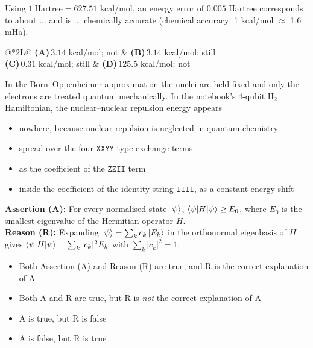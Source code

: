 \documentclass[11pt,a4paper]{article}
\newcommand{\optlabel}[1]{\textbf{(#1)}}
\newenvironment{qitem}[1]{\begin{list}{}{\setlength{\leftmargin}{3.3em}\setlength{\labelwidth}{3.1em}%
  \setlength{\labelsep}{0.2em}\setlength{\topsep}{3pt}\setlength{\parsep}{3pt}}\item[\textbf{Q.#1}\hfill]}{\end{list}}
\newcommand{\qsep}{\par\vspace{2pt}{\color{black!15}\hrule}\vspace{4pt}}
\begin{document}
\begin{qitem}{5}
Using $1\ \text{Hartree} = 627.51$ kcal/mol, an energy error of $0.005$ Hartree corresponds to about ... and is ... chemically
accurate (chemical accuracy: 1 kcal/mol $\approx$ 1.6 mHa).
\par\smallskip\noindent\begin{tabularx}{\linewidth}{@{}*{2}{L}@{}}
\optlabel{A}\,$3.14$ kcal/mol; not & \optlabel{B}\,$3.14$ kcal/mol; still \\[3pt]
\optlabel{C}\,$0.31$ kcal/mol; still & \optlabel{D}\,$125.5$ kcal/mol; not
\end{tabularx}
\end{qitem}
\qsep

\begin{qitem}{6}
In the Born--Oppenheimer approximation the nuclei are held fixed and only the electrons are treated quantum mechanically. In the
notebook's 4-qubit H$_2$ Hamiltonian, the nuclear--nuclear repulsion energy appears
\begin{itemize}[leftmargin=2.6em, labelsep=0.4em, itemsep=2pt, topsep=3pt]
\item[\optlabel{A}] nowhere, because nuclear repulsion is neglected in quantum chemistry
\item[\optlabel{B}] spread over the four $\texttt{XXYY}$-type exchange terms
\item[\optlabel{C}] as the coefficient of the $\texttt{ZZII}$ term
\item[\optlabel{D}] inside the coefficient of the identity string $\texttt{IIII}$, as a constant energy shift
\end{itemize}
\end{qitem}
\qsep

\begin{qitem}{7}
\textbf{Assertion (A):} For every normalised state $\ket\psi$, $\braket{\psi|H|\psi} \ge E_0$, where $E_0$ is the smallest eigenvalue of the
Hermitian operator $H$.\\[1mm]
\textbf{Reason (R):} Expanding $\ket\psi = \sum_k c_k\ket{E_k}$ in the orthonormal eigenbasis of $H$ gives $\braket{\psi|H|\psi} = \sum_k |c_k|^2E_k$ with
$\sum_k|c_k|^2 = 1$.
\begin{itemize}[leftmargin=2.6em, labelsep=0.4em, itemsep=2pt, topsep=3pt]
\item[\optlabel{A}] Both Assertion (A) and Reason (R) are true, and R is the correct explanation of A
\item[\optlabel{B}] Both A and R are true, but R is \emph{not} the correct explanation of A
\item[\optlabel{C}] A is true, but R is false
\item[\optlabel{D}] A is false, but R is true
\end{itemize}
\end{qitem}
\qsep
\end{document}
